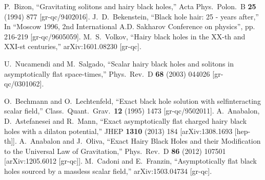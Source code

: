 \begin{small}
\begin{thebibliography}{99}
  P.~Bizon,
  ``Gravitating solitons and hairy black holes,''
  Acta Phys.\ Polon.\ B {\bf 25} (1994) 877
  [gr-qc/9402016].
  J.~D.~Bekenstein,
  ``Black hole hair: 25 - years after,''
  In "`Moscow 1996, 2nd International A.D. Sakharov Conference on physics"', pp. 216-219
  [gr-qc/9605059].
  M.~S.~Volkov,
  ``Hairy black holes in the XX-th and XXI-st centuries,''
  arXiv:1601.08230 [gr-qc].
 
  U.~Nucamendi and M.~Salgado,
  ``Scalar hairy black holes and solitons in asymptotically flat space-times,''
  Phys.\ Rev.\ D {\bf 68} (2003) 044026
  [gr-qc/0301062].

  O.~Bechmann and O.~Lechtenfeld,
  ``Exact black hole solution with selfinteracting scalar field,''
  Class.\ Quant.\ Grav.\  {\bf 12} (1995) 1473
  [gr-qc/9502011].
  A.~Anabalon, D.~Astefanesei and R.~Mann,
  ``Exact asymptotically flat charged hairy black holes with a dilaton potential,''
  JHEP {\bf 1310} (2013) 184
  [arXiv:1308.1693 [hep-th]].
  A.~Anabalon and J.~Oliva,
  ``Exact Hairy Black Holes and their Modification to the Universal Law of Gravitation,''
  Phys.\ Rev.\ D {\bf 86} (2012) 107501
  [arXiv:1205.6012 [gr-qc]].
  M.~Cadoni and E.~Franzin,
  ``Asymptotically flat black holes sourced by a massless scalar field,''
  arXiv:1503.04734 [gr-qc].


\end{thebibliography}
\end{small}
